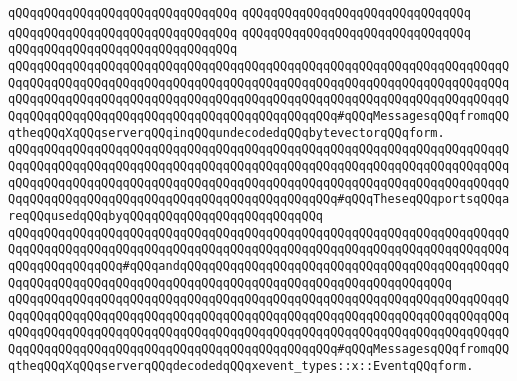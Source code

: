 \verb|qQQqqQQqqQQqqQQqqQQqqQQqqQQqqQQq|\newline
\verb|qQQqqQQqqQQqqQQqqQQqqQQqqQQqqQQq|\newline
\newline
\verb|qQQqqQQqqQQqqQQqqQQqqQQqqQQqqQQq|\newline
\verb|qQQqqQQqqQQqqQQqqQQqqQQqqQQqqQQq|\newline
\verb|qQQqqQQqqQQqqQQqqQQqqQQqqQQqqQQq|\newline
\newline
\verb|qQQqqQQqqQQqqQQqqQQqqQQqqQQqqQQqqQQqqQQqqQQqqQQqqQQqqQQqqQQqqQQqqQQqqQQqqQQqqQQqqQQqqQQqqQQqqQQqqQQqqQQqqQQqqQQqqQQqqQQqqQQqqQQqqQQqqQQqqQQqqQQqqQQqqQQqqQQqqQQqqQQqqQQqqQQqqQQqqQQqqQQqqQQqqQQqqQQqqQQqqQQqqQQqqQQqqQQqqQQqqQQqqQQqqQQqqQQqqQQqqQQqqQQqqQQqqQQq#qQQqMessagesqQQqfromqQQqtheqQQqXqQQqserverqQQqinqQQqundecodedqQQqbytevectorqQQqform.|\newline
\verb|qQQqqQQqqQQqqQQqqQQqqQQqqQQqqQQqqQQqqQQqqQQqqQQqqQQqqQQqqQQqqQQqqQQqqQQqqQQqqQQqqQQqqQQqqQQqqQQqqQQqqQQqqQQqqQQqqQQqqQQqqQQqqQQqqQQqqQQqqQQqqQQqqQQqqQQqqQQqqQQqqQQqqQQqqQQqqQQqqQQqqQQqqQQqqQQqqQQqqQQqqQQqqQQqqQQqqQQqqQQqqQQqqQQqqQQqqQQqqQQqqQQqqQQqqQQqqQQq#qQQqTheseqQQqportsqQQqareqQQqusedqQQqbyqQQqqQQqqQQqqQQqqQQqqQQqqQQq|\newline
\verb|qQQqqQQqqQQqqQQqqQQqqQQqqQQqqQQq|\verb|qQQqqQQqqQQqqQQqqQQqqQQqqQQqqQQqqQQqqQQqqQQqqQQqqQQqqQQqqQQqqQQqqQQqqQQqqQQqqQQqqQQqqQQqqQQqqQQqqQQqqQQqqQQqqQQqqQQqqQQqqQQq#qQQqandqQQqqQQqqQQqqQQqqQQqqQQqqQQqqQQqqQQqqQQqqQQqqQQqqQQqqQQqqQQqqQQqqQQqqQQqqQQqqQQqqQQqqQQqqQQqqQQqqQQqqQQqqQQq|\newline
\newline
\verb|qQQqqQQqqQQqqQQqqQQqqQQqqQQqqQQqqQQqqQQqqQQqqQQqqQQqqQQqqQQqqQQqqQQqqQQqqQQqqQQqqQQqqQQqqQQqqQQqqQQqqQQqqQQqqQQqqQQqqQQqqQQqqQQqqQQqqQQqqQQqqQQqqQQqqQQqqQQqqQQqqQQqqQQqqQQqqQQqqQQqqQQqqQQqqQQqqQQqqQQqqQQqqQQqqQQqqQQqqQQqqQQqqQQqqQQqqQQqqQQqqQQqqQQqqQQqqQQq#qQQqMessagesqQQqfromqQQqtheqQQqXqQQqserverqQQqdecodedqQQqxevent_types::x::EventqQQqform.|\newline
